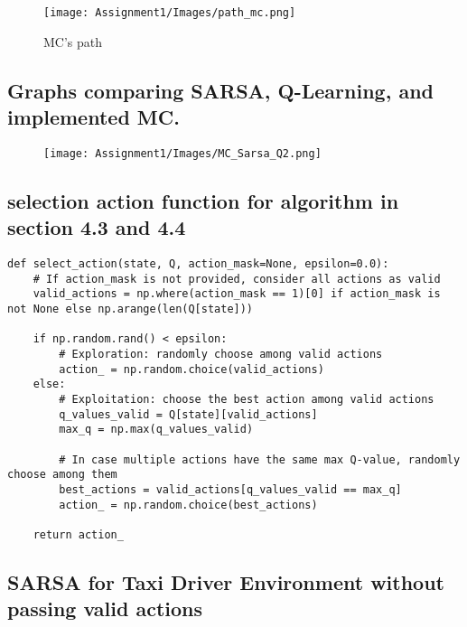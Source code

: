 \documentclass[11pt,a4paper]{article}
\begin{document}
\begin{figure}[h!]
    \centering
    \texttt{[image: Assignment1/Images/path\_mc.png]}
    \caption{MC's path}
    \label{fig:yourlabel}
\end{figure}

\subsection{Graphs comparing SARSA, Q-Learning, and implemented MC.}

\begin{figure}[h!]
    \centering
    \texttt{[image: Assignment1/Images/MC\_Sarsa\_Q2.png]}
    \label{fig:yourlabel}
\end{figure}

\subsection{selection action function for algorithm in section 4.3 and 4.4}

\begin{lstlisting}
def select_action(state, Q, action_mask=None, epsilon=0.0):
    # If action_mask is not provided, consider all actions as valid
    valid_actions = np.where(action_mask == 1)[0] if action_mask is not None else np.arange(len(Q[state]))

    if np.random.rand() < epsilon:
        # Exploration: randomly choose among valid actions
        action_ = np.random.choice(valid_actions)
    else:
        # Exploitation: choose the best action among valid actions
        q_values_valid = Q[state][valid_actions]
        max_q = np.max(q_values_valid)
        
        # In case multiple actions have the same max Q-value, randomly choose among them
        best_actions = valid_actions[q_values_valid == max_q]
        action_ = np.random.choice(best_actions)

    return action_

\end{lstlisting}

\subsection{SARSA for Taxi Driver Environment without passing valid actions}
\end{document}
